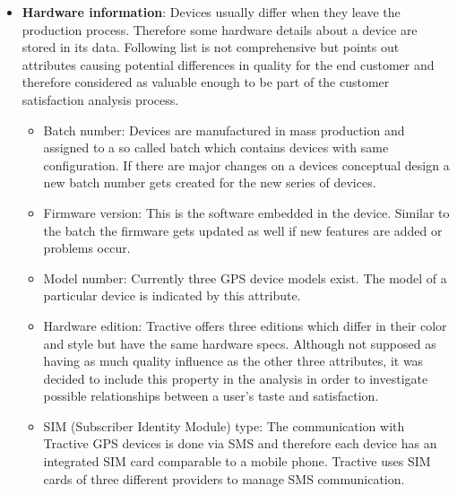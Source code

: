 \begin{itemize}
	\item \textbf{Hardware information}: Devices usually differ when they leave the production process. Therefore some hardware details about a device are stored in its data. Following list is not comprehensive but points out attributes causing potential differences in quality for the end customer and therefore considered as valuable enough to be part of the customer satisfaction analysis process.
	
	\begin{itemize}
		\item Batch number: Devices are manufactured in mass production and assigned to a so called batch which contains devices with same configuration. If there are major changes on a devices conceptual design a new batch number gets created for the new series of devices. 
		\item Firmware version: This is the software embedded in the device. Similar to the batch the firmware gets updated as well if new features are added or problems occur. 
		\item Model number: Currently three GPS device models exist. The model of a particular device is indicated by this attribute. 
		\item Hardware edition: Tractive offers three editions which differ in their color and style but have the same hardware specs. Although not supposed as having as much quality influence as the other three attributes, it was decided to include this property in the analysis in order to investigate possible relationships between a user's taste and satisfaction. 
		\item SIM (Subscriber Identity Module) type: The communication with Tractive GPS devices is done via SMS and therefore each device has an integrated SIM card comparable to a mobile phone. Tractive uses SIM cards of three different providers to manage SMS communication. 
	\end{itemize}


\end{itemize}
